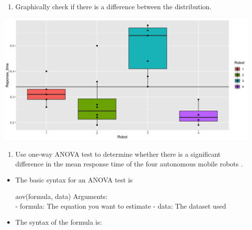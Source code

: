 \documentclass[]{book}
\newenvironment{Shaded}{\begin{snugshade}}{\end{snugshade}}
\newcommand{\DataTypeTok}[1]{\textcolor[rgb]{0.13,0.29,0.53}{#1}}
\newcommand{\KeywordTok}[1]{\textcolor[rgb]{0.13,0.29,0.53}{\textbf{#1}}}
\newcommand{\NormalTok}[1]{#1}
\newcommand{\OperatorTok}[1]{\textcolor[rgb]{0.81,0.36,0.00}{\textbf{#1}}}
\newcommand{\StringTok}[1]{\textcolor[rgb]{0.31,0.60,0.02}{#1}}
\providecommand{\tightlist}{%
  \setlength{\itemsep}{0pt}\setlength{\parskip}{0pt}}
\begin{document}
\begin{enumerate}
\def\labelenumi{\arabic{enumi}.}
\setcounter{enumi}{4}
\tightlist
\item
  Graphically check if there is a difference between the distribution.
\end{enumerate}

\begin{Shaded}
\end{Shaded}

\begin{center}\includegraphics{figure/unnamed-chunk-14-1} \end{center}

\begin{enumerate}
\def\labelenumi{\arabic{enumi}.}
\setcounter{enumi}{5}
\tightlist
\item
  Use one-way ANOVA test to determine whether there is a significant difference in the mean response time of the four autonomous mobile robots .
\end{enumerate}

\begin{itemize}
\item
  The basic syntax for an ANOVA test is

  aov(formula, data)
  Arguments:\\
  - formula: The equation you want to estimate
  - data: The dataset used
\item
  The syntax of the formula is:
\end{itemize}
\end{document}
